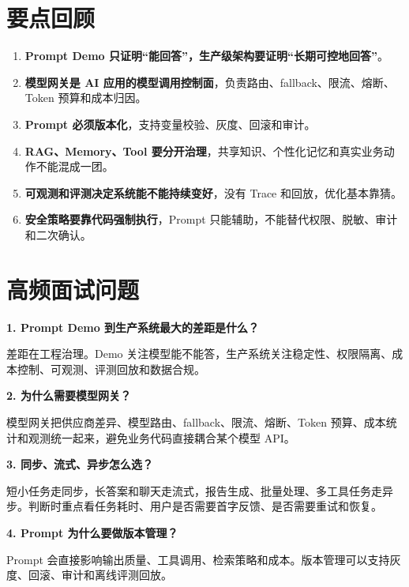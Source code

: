 \documentclass[10pt,a4paper]{ctexart}
\begin{document}
\section{要点回顾}

\begin{enumerate}[itemsep=2pt, topsep=4pt]
  \item \textbf{Prompt Demo 只证明“能回答”，生产级架构要证明“长期可控地回答”}。
  \item \textbf{模型网关是 AI 应用的模型调用控制面}，负责路由、fallback、限流、熔断、Token 预算和成本归因。
  \item \textbf{Prompt 必须版本化}，支持变量校验、灰度、回滚和审计。
  \item \textbf{RAG、Memory、Tool 要分开治理}，共享知识、个性化记忆和真实业务动作不能混成一团。
  \item \textbf{可观测和评测决定系统能不能持续变好}，没有 Trace 和回放，优化基本靠猜。
  \item \textbf{安全策略要靠代码强制执行}，Prompt 只能辅助，不能替代权限、脱敏、审计和二次确认。
\end{enumerate}


\section{高频面试问题}


\textbf{1. Prompt Demo 到生产系统最大的差距是什么？}



差距在工程治理。Demo 关注模型能不能答，生产系统关注稳定性、权限隔离、成本控制、可观测、评测回放和数据合规。



\textbf{2. 为什么需要模型网关？}



模型网关把供应商差异、模型路由、fallback、限流、熔断、Token 预算、成本统计和观测统一起来，避免业务代码直接耦合某个模型 API。



\textbf{3. 同步、流式、异步怎么选？}



短小任务走同步，长答案和聊天走流式，报告生成、批量处理、多工具任务走异步。判断时重点看任务耗时、用户是否需要首字反馈、是否需要重试和恢复。



\textbf{4. Prompt 为什么要做版本管理？}



Prompt 会直接影响输出质量、工具调用、检索策略和成本。版本管理可以支持灰度、回滚、审计和离线评测回放。
\end{document}
